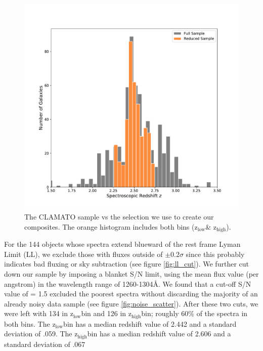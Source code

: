 \documentclass[preprint2,times,tighten]{aastex6}
\newcommand{\hiz}{$\mathrm{z_{high}}$\space}
\newcommand{\loz}{$\mathrm{z_{low}}$\space}
\begin{document}
\begin{figure}[ht]
    \begin{center}
    \includegraphics[width=\columnwidth]{clamatohist.pdf}
    \caption{The CLAMATO sample vs the selection we use to create our composites. The orange histogram includes both bins (\loz \& \hiz).}
    \label{fig:clamatohist}
    \end{center}
\end{figure}

For the 144 objects whose spectra extend blueward of the rest frame Lyman Limit (LL), we exclude those with fluxes outside of $\pm 0.2\sigma$ since this probably indicates bad fluxing or sky subtraction (see figure \ref{fig:ll_cut}). We further cut down our sample by imposing a blanket S/N limit, using the mean flux value (per angstrom) in the wavelength range of 1260-1304\AA. We found that a cut-off S/N value of = 1.5 excluded the poorest spectra without discarding the majority of an already noisy data sample (see figure \ref{fig:noise_scatter}). After these two cuts, we were left with 134 in \loz bin and 126 in \hiz bin; roughly 60\% of the spectra in both bins. The \loz bin has a median redshift value of 2.442 and a standard deviation of .059. The \hiz bin has a median redshift value of 2.606 and a standard deviation of .067
\end{document}
